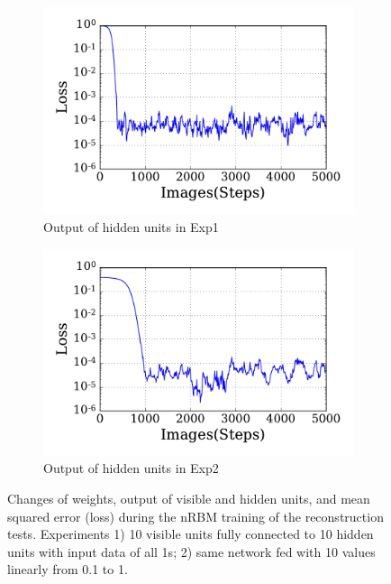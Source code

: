\begin{figure}
\begin{subfigure}[t]{0.48\textwidth}
		\DIFaddendFL \includegraphics[width=\textwidth]{pics_sdlm/30_exp_RBM/exp1_loss.pdf}
		\caption{Output of hidden units in Exp1}
	\end{subfigure}
	\DIFdelbeginFL %
\DIFdelendFL \DIFaddbeginFL \begin{subfigure}[t]{0.48\textwidth}
		\DIFaddendFL \includegraphics[width=\textwidth]{pics_sdlm/30_exp_RBM/exp2_loss.pdf}
		\caption{Output of hidden units in Exp2}
	\end{subfigure}
	\caption{Changes of weights, output of visible and hidden units, and mean squared error (loss) during the nRBM training of the reconstruction tests. 
		Experiments 1) 10 visible units fully connected to 10 hidden units with input data of all 1s; 2) \DIFaddbeginFL {}\DIFaddendFL same network fed with 10 values \DIFdelbeginFL {}\DIFdelendFL \DIFaddbeginFL {}\DIFaddendFL linearly from 0.1 to 1.}
	\label{fig:rbm_orig}
\end{figure}

